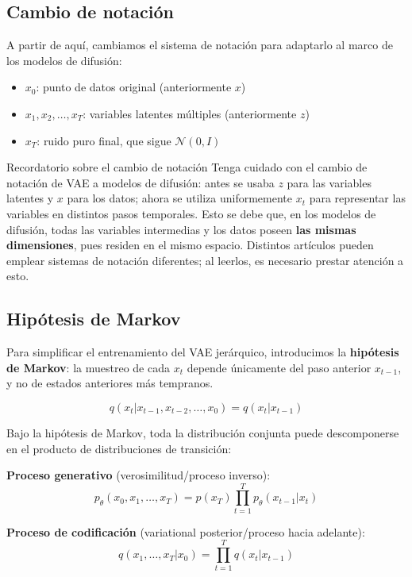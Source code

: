 \documentclass[a4paper]{article}
\begin{document}
\subsection{Cambio de notación}

A partir de aquí, cambiamos el sistema de notación para adaptarlo al marco de los modelos de difusión:

\begin{itemize}
    \item $x_0$: punto de datos original (anteriormente $x$)
    \item $x_1, x_2, \ldots, x_T$: variables latentes múltiples (anteriormente $z$)
    \item $x_T$: ruido puro final, que sigue $\mathcal{N}(0, I)$
\end{itemize}

\begin{warningbox}{Recordatorio sobre el cambio de notación}
Tenga cuidado con el cambio de notación de VAE a modelos de difusión: antes se usaba $z$ para las variables latentes y $x$ para los datos; ahora se utiliza uniformemente $x_t$ para representar las variables en distintos pasos temporales. Esto se debe que, en los modelos de difusión, todas las variables intermedias y los datos poseen \textbf{las mismas dimensiones}, pues residen en el mismo espacio. Distintos artículos pueden emplear sistemas de notación diferentes; al leerlos, es necesario prestar atención a esto.
\end{warningbox}

\subsection{Hipótesis de Markov}

Para simplificar el entrenamiento del VAE jerárquico, introducimos la \textbf{hipótesis de Markov}: la muestreo de cada $x_t$ depende únicamente del paso anterior $x_{t-1}$, y no de estados anteriores más tempranos.

$$q(x_t | x_{t-1}, x_{t-2}, \ldots, x_0) = q(x_t | x_{t-1})$$

Bajo la hipótesis de Markov, toda la distribución conjunta puede descomponerse en el producto de distribuciones de transición:

\textbf{Proceso generativo} (verosimilitud/proceso inverso):
$$p_\theta(x_0, x_1, \ldots, x_T) = p(x_T) \prod_{t=1}^{T} p_\theta(x_{t-1} | x_t)$$

\textbf{Proceso de codificación} (variational posterior/proceso hacia adelante):
$$q(x_1, \ldots, x_T | x_0) = \prod_{t=1}^{T} q(x_t | x_{t-1})$$
\end{document}
